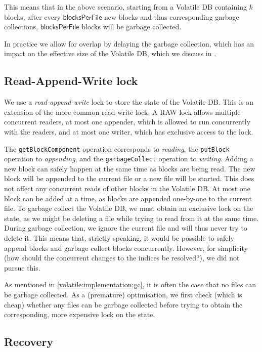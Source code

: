 This means that in the above scenario, starting from a Volatile DB containing
$k$ blocks, after every $\mathsf{blocksPerFile}$ new blocks and thus
corresponding garbage collections, $\mathsf{blocksPerFile}$ blocks will be
garbage collected.

In practice we allow for overlap by delaying the garbage collection, which has
an impact on the effective size of the Volatile DB, which we discuss in
.

\subsection{Read-Append-Write lock}
\label{volatile:implementation:rawlock}

We use a \emph{read-append-write} lock to store the state of the Volatile DB.
This is an extension of the more common read-write lock. A RAW lock allows
multiple concurrent readers, at most one appender, which is allowed to run
concurrently with the readers, and at most one writer, which has exclusive
access to the lock.

The \lstinline!getBlockComponent! operation corresponds to \emph{reading}, the
\lstinline!putBlock! operation to \emph{appending}, and the
\lstinline!garbageCollect! operation to \emph{writing}. Adding a new block can
safely happen at the same time as blocks are being read. The new block will be
appended to the current file or a new file will be started. This does not affect
any concurrent reads of other blocks in the Volatile DB. At most one block can
be added at a time, as blocks are appended one-by-one to the current file. To
garbage collect the Volatile DB, we must obtain an exclusive lock on the state,
as we might be deleting a file while trying to read from it at the same time.
During garbage collection, we ignore the current file and will thus never try to
delete it. This means that, strictly speaking, it would be possible to safely
append blocks and garbage collect blocks concurrently. However, for simplicity
(how should the concurrent changes to the indices be resolved?), we did not
pursue this.

As mentioned in \cref{volatile:implementation:gc}, it is often the case that no
files can be garbage collected. As a (premature) optimisation, we first check
(which is cheap) whether any files can be garbage collected before trying to
obtain the corresponding, more expensive lock on the state.

\subsection{Recovery}
\label{volatile:implementation:recovery}

